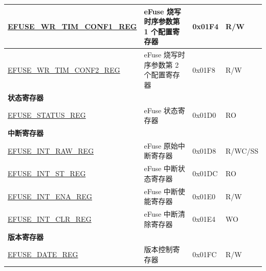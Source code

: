 \begin{longtable}{ | p{6cm} | p{7.2cm} | p{1.3cm} | p{1cm} | }
\hyperref[regdesc:EFUSEWRTIMCONF1REG]{EFUSE\_WR\_TIM\_CONF1\_REG} & eFuse 烧写时序参数第 1 个配置寄存器  & 0x01F4 & R/W \\ \hline
\hyperref[regdesc:EFUSEWRTIMCONF2REG]{EFUSE\_WR\_TIM\_CONF2\_REG} & eFuse 烧写时序参数第 2 个配置寄存器  & 0x01F8 & R/W \\ \hline
\multicolumn{4}{|l|}{\textbf{状态寄存器}} \\ \hline
\hyperref[regdesc:EFUSESTATUSREG]{EFUSE\_STATUS\_REG} & eFuse 状态寄存器  & 0x01D0 & RO \\ \hline
\multicolumn{4}{|l|}{\textbf{中断寄存器}} \\ \hline
\hyperref[regdesc:EFUSEINTRAWREG]{EFUSE\_INT\_RAW\_REG} & eFuse 原始中断寄存器  & 0x01D8 & R/WC/SS \\ \hline
\hyperref[regdesc:EFUSEINTSTREG]{EFUSE\_INT\_ST\_REG} & eFuse 中断状态寄存器  & 0x01DC & RO \\ \hline
\hyperref[regdesc:EFUSEINTENAREG]{EFUSE\_INT\_ENA\_REG} & eFuse 中断使能寄存器  & 0x01E0 & R/W \\ \hline
\hyperref[regdesc:EFUSEINTCLRREG]{EFUSE\_INT\_CLR\_REG} & eFuse 中断清除寄存器  & 0x01E4 & WO \\ \hline
\multicolumn{4}{|l|}{\textbf{版本寄存器}} \\ \hline
\hyperref[regdesc:EFUSEDATEREG]{EFUSE\_DATE\_REG} & 版本控制寄存器  & 0x01FC & R/W \\ \hline
\end{longtable}
